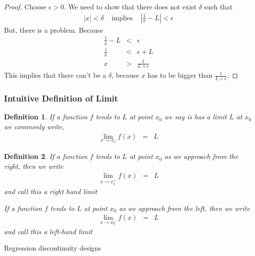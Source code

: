 \documentclass{beamer}
\newtheorem{defn}{Definition}
\numberwithin{equation}{section}
\begin{document}
\begin{frame}


\begin{proof}

Choose $\epsilon>0$.  We need to show that there \alert{does not} exist $\delta$ such that
\begin{eqnarray}
|x | < \delta & \text{ implies } & \left|\frac{1}{x} - L \right| <  \epsilon \nonumber 
\end{eqnarray}
But, there is a problem.  Because 
\begin{eqnarray}
\frac{1}{x} - L & <& \epsilon \nonumber \\
\frac{1}{x} & < & \epsilon + L \nonumber \\
x & > & \frac{1}{L + \epsilon} \nonumber 
\end{eqnarray}
This implies that there \alert{can't} be a $\delta$, because $x$ has to be bigger than $\frac{1}{L + \epsilon}$. 

\end{proof}


\end{frame}




\begin{frame}
\frametitle{Intuitive Definition of Limit}

\begin{defn} If a function $f$ tends to $L$ at point $x_{0}$ we say is has a limit $L$ at $x_{0}$ we commonly write, 
\begin{eqnarray}
\lim_{x \rightarrow x_{0}} f(x) & = & L \nonumber 
\end{eqnarray}
\end{defn}

\end{frame}


\begin{frame}


\begin{defn} If a function $f$ tends to $L$ at point $x_{0}$ as we approach from the right, then we write
\begin{eqnarray}
\lim_{x \rightarrow x_{0}^{+} } f(x) & = & L \nonumber 
\end{eqnarray}
and call this a \alert{right hand limit} 

If a function $f$ tends to $L$ at point $x_{0}$ as we approach from the left, then we write
\begin{eqnarray}
\lim_{x \rightarrow x_{0}^{-} } f(x) & = & L \nonumber
\end{eqnarray}
and call this a left-hand limit
\end{defn}

\alert{Regression discontinuity designs}


\end{frame}
\end{document}
